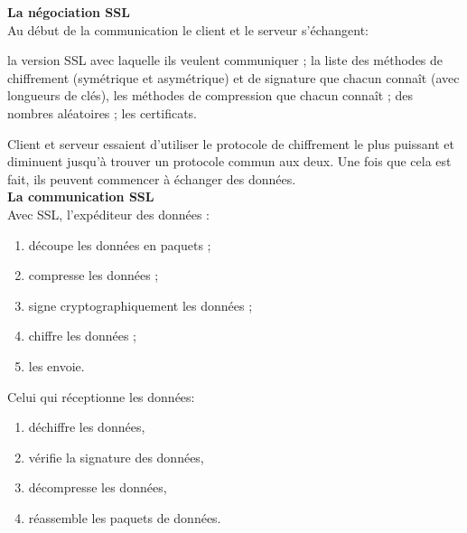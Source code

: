 \textbf{\RIGHTarrow La négociation SSL}\\
Au début de la communication le client et le serveur s'échangent:
\begin{itemize}
	\itemcheck la version SSL avec laquelle ils veulent communiquer ;
	\itemcheck la liste des méthodes de chiffrement (symétrique et asymétrique) et de signature que chacun connaît (avec longueurs de clés),
	\itemcheck les méthodes de compression que chacun connaît ;
	\itemcheck des nombres aléatoires ;
	\itemcheck les certificats.
\end{itemize}
Client et serveur essaient d'utiliser le protocole de chiffrement le plus puissant et diminuent jusqu'à trouver un protocole commun aux deux. Une fois que cela est fait, ils peuvent commencer à échanger des données.\\

\textbf{\RIGHTarrow La communication SSL}\\ 
Avec SSL, l'expéditeur des données :
\begin{enumerate}
	\item découpe les données en paquets ;
	\item compresse les données ;
	\item signe cryptographiquement les données ;
	\item chiffre les données ;
	\item les envoie.
\end{enumerate}
Celui qui réceptionne les données:
\begin{enumerate}
	\item déchiffre les données,
	\item vérifie la signature des données,
	\item décompresse les données,
	\item réassemble les paquets de données.\\
\end{enumerate}

